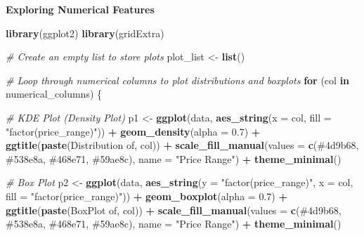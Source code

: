 \documentclass[
]{article}
\newenvironment{Shaded}{\begin{snugshade}}{\end{snugshade}}
\newcommand{\AttributeTok}[1]{\textcolor[rgb]{0.13,0.29,0.53}{#1}}
\newcommand{\CommentTok}[1]{\textcolor[rgb]{0.56,0.35,0.01}{\textit{#1}}}
\newcommand{\ControlFlowTok}[1]{\textcolor[rgb]{0.13,0.29,0.53}{\textbf{#1}}}
\newcommand{\FloatTok}[1]{\textcolor[rgb]{0.00,0.00,0.81}{#1}}
\newcommand{\FunctionTok}[1]{\textcolor[rgb]{0.13,0.29,0.53}{\textbf{#1}}}
\newcommand{\NormalTok}[1]{#1}
\newcommand{\OtherTok}[1]{\textcolor[rgb]{0.56,0.35,0.01}{#1}}
\newcommand{\SpecialCharTok}[1]{\textcolor[rgb]{0.81,0.36,0.00}{\textbf{#1}}}
\newcommand{\StringTok}[1]{\textcolor[rgb]{0.31,0.60,0.02}{#1}}
\begin{document}
\textbf{Exploring Numerical Features}

\begin{Shaded}
\begin{Highlighting}[]
\FunctionTok{library}\NormalTok{(ggplot2)}
\FunctionTok{library}\NormalTok{(gridExtra)}

\CommentTok{\# Create an empty list to store plots}
\NormalTok{plot\_list }\OtherTok{\textless{}{-}} \FunctionTok{list}\NormalTok{()}

\CommentTok{\# Loop through numerical columns to plot distributions and boxplots}
\ControlFlowTok{for}\NormalTok{ (col }\ControlFlowTok{in}\NormalTok{ numerical\_columns) \{}
  
  \CommentTok{\# KDE Plot (Density Plot)}
\NormalTok{  p1 }\OtherTok{\textless{}{-}} \FunctionTok{ggplot}\NormalTok{(data, }\FunctionTok{aes\_string}\NormalTok{(}\AttributeTok{x =}\NormalTok{ col, }\AttributeTok{fill =} \StringTok{"factor(price\_range)"}\NormalTok{)) }\SpecialCharTok{+}
    \FunctionTok{geom\_density}\NormalTok{(}\AttributeTok{alpha =} \FloatTok{0.7}\NormalTok{) }\SpecialCharTok{+}
    \FunctionTok{ggtitle}\NormalTok{(}\FunctionTok{paste}\NormalTok{(}\StringTok{\textquotesingle{}Distribution of\textquotesingle{}}\NormalTok{, col)) }\SpecialCharTok{+}
    \FunctionTok{scale\_fill\_manual}\NormalTok{(}\AttributeTok{values =} \FunctionTok{c}\NormalTok{(}\StringTok{\textquotesingle{}\#4d9b68\textquotesingle{}}\NormalTok{, }\StringTok{\textquotesingle{}\#538e8a\textquotesingle{}}\NormalTok{, }\StringTok{\textquotesingle{}\#468e71\textquotesingle{}}\NormalTok{, }\StringTok{\textquotesingle{}\#59ae8c\textquotesingle{}}\NormalTok{), }\AttributeTok{name =} \StringTok{"Price Range"}\NormalTok{) }\SpecialCharTok{+}
    \FunctionTok{theme\_minimal}\NormalTok{()}
  
  \CommentTok{\# Box Plot}
\NormalTok{  p2 }\OtherTok{\textless{}{-}} \FunctionTok{ggplot}\NormalTok{(data, }\FunctionTok{aes\_string}\NormalTok{(}\AttributeTok{y =} \StringTok{"factor(price\_range)"}\NormalTok{, }\AttributeTok{x =}\NormalTok{ col, }\AttributeTok{fill =} \StringTok{"factor(price\_range)"}\NormalTok{)) }\SpecialCharTok{+}
    \FunctionTok{geom\_boxplot}\NormalTok{(}\AttributeTok{alpha =} \FloatTok{0.7}\NormalTok{) }\SpecialCharTok{+}
    \FunctionTok{ggtitle}\NormalTok{(}\FunctionTok{paste}\NormalTok{(}\StringTok{\textquotesingle{}BoxPlot of\textquotesingle{}}\NormalTok{, col)) }\SpecialCharTok{+}
    \FunctionTok{scale\_fill\_manual}\NormalTok{(}\AttributeTok{values =} \FunctionTok{c}\NormalTok{(}\StringTok{\textquotesingle{}\#4d9b68\textquotesingle{}}\NormalTok{, }\StringTok{\textquotesingle{}\#538e8a\textquotesingle{}}\NormalTok{, }\StringTok{\textquotesingle{}\#468e71\textquotesingle{}}\NormalTok{, }\StringTok{\textquotesingle{}\#59ae8c\textquotesingle{}}\NormalTok{), }\AttributeTok{name =} \StringTok{"Price Range"}\NormalTok{) }\SpecialCharTok{+}
    \FunctionTok{theme\_minimal}\NormalTok{()}
  

\end{Highlighting}
\end{Shaded}
\end{document}
